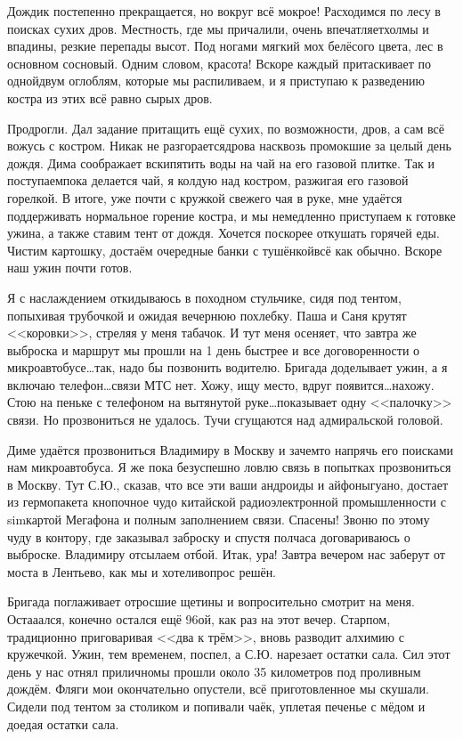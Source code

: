 Дождик постепенно прекращается, но вокруг всё мокрое! Расходимся по лесу в поисках сухих дров. Местность, где мы причалили, очень впечатляет\mdash холмы и впадины, резкие перепады высот. Под ногами мягкий мох белёсого цвета, лес в основном сосновый. Одним словом, красота! Вскоре каждый притаскивает по одной\sdash двум оглоблям, которые мы распиливаем, и я приступаю к разведению костра из этих всё равно сырых дров. 

Продрогли. Дал задание притащить ещё сухих, по возможности, дров, а сам всё вожусь с костром. Никак не разгорается\mdash дрова насквозь промокшие за целый день дождя. Дима соображает вскипятить воды на чай на его газовой плитке. Так и поступаем\mdash пока делается чай, я колдую над костром, разжигая его газовой горелкой. В итоге, уже почти с кружкой свежего чая в руке, мне удаётся поддерживать нормальное горение костра, и мы немедленно приступаем к готовке ужина, а также ставим тент от дождя. Хочется поскорее откушать горячей еды. Чистим картошку, достаём очередные банки с тушёнкой\mdash всё как обычно. Вскоре наш ужин почти готов. 

Я с наслаждением откидываюсь в походном стульчике, сидя под тентом, попыхивая трубочкой и ожидая вечернюю похлебку. Паша и Саня крутят <<коровки>>, стреляя у меня табачок. И тут меня осеняет, что завтра же выброска и маршрут мы прошли на 1 день быстрее и все договоренности о микроавтобусе\ldots так, надо бы позвонить водителю. Бригада доделывает ужин, а я включаю телефон\ldots связи МТС нет. Хожу, ищу место, вдруг появится\ldots нахожу. Стою на пеньке с телефоном на вытянутой руке\ldots показывает одну <<палочку>> связи. Но прозвониться не удалось. Тучи сгущаются над адмиральской головой. 

Диме удаётся прозвониться Владимиру в Москву и зачем\sdash то напрячь его поисками нам микроавтобуса. Я же пока безуспешно ловлю связь в попытках прозвониться в Москву. Тут С.Ю., сказав, что все эти ваши андроиды и айфоны\mdash гуано, достает из гермопакета кнопочное чудо китайской радиоэлектронной промышленности с sim\sdash картой Мегафона и полным заполнением связи. Спасены! Звоню по этому чуду в контору, где заказывал заброску и спустя полчаса договариваюсь о выброске. Владимиру отсылаем отбой. Итак, ура! Завтра вечером нас заберут от моста в Лентьево, как мы и хотели\mdash вопрос решён.

Бригада поглаживает отросшие щетины и вопросительно смотрит на меня. Оста\sdash а\sdash ался, конечно остался ещё 96\sdash ой, как раз на этот вечер. Старпом, традиционно приговаривая <<два к трём>>, вновь разводит алхимию с кружечкой. Ужин, тем временем, поспел, а С.Ю. нарезает остатки сала. Сил этот день у нас отнял прилично\mdash мы прошли около 35 километров под проливным дождём. Фляги мои окончательно опустели, всё приготовленное мы скушали. Сидели под тентом за столиком и попивали чаёк, уплетая печенье с мёдом и доедая остатки сала. 

